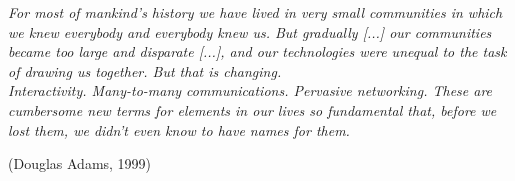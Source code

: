 \documentclass[12pt,a4paper]{scrreprt}
\begin{document}






\newpage
\thispagestyle{empty}


\vspace*{19em}

\begin{flushleft}
  \textit{\flqq For most of mankind's history we have lived in very small communities in which we knew everybody and everybody knew us. But gradually [...] our communities became too large and disparate [...], and our technologies were unequal to the task of drawing us together. But that is changing.}\\
  \textit{Interactivity. Many-to-many communications. Pervasive networking. These are cumbersome new terms for elements in our lives so fundamental that, before we lost them, we didn’t even know to have names for them.\frqq}
\end{flushleft}

\begin{flushright}
  {\scriptsize(Douglas Adams, 1999)}
\end{flushright}


\newpage


\thispagestyle{empty}

\restoregeometry


\renewcommand\thepage{}
\begin{spacing}{1.05}
\tableofcontents
\end{spacing}

\newpage

\renewcommand\thepage{\arabic{page}}



\pagestyle{scrheadings}
\clearscrheadings
{} %
\clearscrplain
{}
\ohead[\pagemark]{\pagemark}%
\ihead{\headmark}
\setheadsepline{0.02cm} %

 

\setcounter{page}{1} 
 

 
\end{document}
